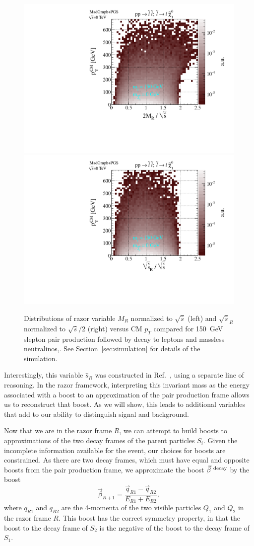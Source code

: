 \begin{figure}[ht]
\includegraphics[width=0.4\columnwidth]{fig/sectionII/MR_norm_v_pTCM.pdf}
\includegraphics[width=0.4\columnwidth]{fig/sectionII/shat_norm_v_pTCM.pdf}
\caption{Distributions of razor variable $M_R$ normalized to $\sqrt{\hat{s}}$ (left) and $\sqrt{\hat{s}}_R$ normalized to $\sqrt{\hat{s}}/2$ (right) versus CM $p_T$ compared for 150~GeV slepton pair production followed by decay to leptons and massless neutralinos,. See Section~\ref{sec:simulation} for details of the simulation. \label{fig:hatsMR}}
\end{figure}

Interestingly, this variable $\hat{s}_R$ was constructed in Ref.~\cite{Rainwater:1999sd}, %
using a separate line of reasoning. In the razor framework, interpreting this invariant mass as the energy associated with a boost to an approximation of the pair production frame allows us to reconstruct that boost. As we will show, this leads to additional variables that add to our ability to distinguish signal and background.

Now that we are in the razor frame $R$, we can attempt to build boosts to approximations of the two decay frames of the parent particles $S_i$. Given the incomplete information available for the event, our choices for boosts are constrained. As there are two decay frames, which must have equal and opposite boosts from the pair production frame, we approximate the boost $\vec{\beta}^{~\rm decay}$ by the boost
\begin{equation}
\vec{\beta}_{R+1} = \frac{\vec{q}_{R1}-\vec{q}_{R2}}{E_{R1}+E_{R2}}, \label{eq:razorbeta1}
\end{equation}
where $q_{R1}$ and $q_{R2}$ are the 4-momenta of the two visible particles $Q_1$ and $Q_2$ in the razor frame $R$. This boost has the correct symmetry property, in that the boost to the decay frame of $S_2$ is the negative of the boost to the decay frame of $S_1$. 


